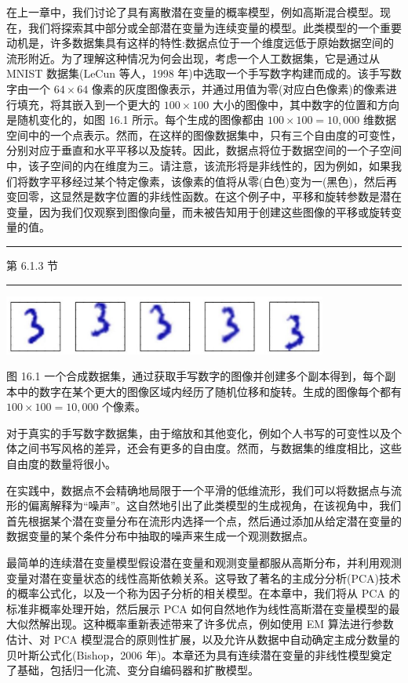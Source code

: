 \documentclass[10pt]{article}
\newcommand{\HRule}{\begin{center}\rule{0.9\linewidth}{0.2mm}\end{center}}
\begin{document}
在上一章中，我们讨论了具有离散潜在变量的概率模型，例如高斯混合模型。现在，我们将探索其中部分或全部潜在变量为连续变量的模型。此类模型的一个重要动机是，许多数据集具有这样的特性:数据点位于一个维度远低于原始数据空间的流形附近。为了理解这种情况为何会出现，考虑一个人工数据集，它是通过从 MNIST 数据集(LeCun 等人，1998 年)中选取一个手写数字构建而成的。该手写数字由一个 \({64} \times  {64}\) 像素的灰度图像表示，并通过用值为零(对应白色像素)的像素进行填充，将其嵌入到一个更大的 \({100} \times  {100}\) 大小的图像中，其中数字的位置和方向是随机变化的，如图 16.1 所示。每个生成的图像都由 \({100} \times  {100} = {10},{000}\) 维数据空间中的一个点表示。然而，在这样的图像数据集中，只有三个自由度的可变性，分别对应于垂直和水平平移以及旋转。因此，数据点将位于数据空间的一个子空间中，该子空间的内在维度为三。请注意，该流形将是非线性的，因为例如，如果我们将数字平移经过某个特定像素，该像素的值将从零(白色)变为一(黑色)，然后再变回零，这显然是数字位置的非线性函数。在这个例子中，平移和旋转参数是潜在变量，因为我们仅观察到图像向量，而未被告知用于创建这些图像的平移或旋转变量的值。

\HRule

第 6.1.3 节

\HRule

\begin{center}
\includegraphics[max width=0.8\textwidth]{images/0194e279-9b28-703a-88f4-c3ac21e2010d_515_409_363_1026_189_0.jpg}
\end{center}
\hspace*{3em} 

图 16.1 一个合成数据集，通过获取手写数字的图像并创建多个副本得到，每个副本中的数字在某个更大的图像区域内经历了随机位移和旋转。生成的图像每个都有 \({100} \times  {100} = {10},{000}\) 个像素。

对于真实的手写数字数据集，由于缩放和其他变化，例如个人书写的可变性以及个体之间书写风格的差异，还会有更多的自由度。然而，与数据集的维度相比，这些自由度的数量将很小。

在实践中，数据点不会精确地局限于一个平滑的低维流形，我们可以将数据点与流形的偏离解释为“噪声”。这自然地引出了此类模型的生成视角，在该视角中，我们首先根据某个潜在变量分布在流形内选择一个点，然后通过添加从给定潜在变量的数据变量的某个条件分布中抽取的噪声来生成一个观测数据点。

最简单的连续潜在变量模型假设潜在变量和观测变量都服从高斯分布，并利用观测变量对潜在变量状态的线性高斯依赖关系。这导致了著名的主成分分析(PCA)技术的概率公式化，以及一个称为因子分析的相关模型。在本章中，我们将从 PCA 的标准非概率处理开始，然后展示 PCA 如何自然地作为线性高斯潜在变量模型的最大似然解出现。这种概率重新表述带来了许多优点，例如使用 EM 算法进行参数估计、对 PCA 模型混合的原则性扩展，以及允许从数据中自动确定主成分数量的贝叶斯公式化(Bishop，2006 年)。本章还为具有连续潜在变量的非线性模型奠定了基础，包括归一化流、变分自编码器和扩散模型。
\end{document}
